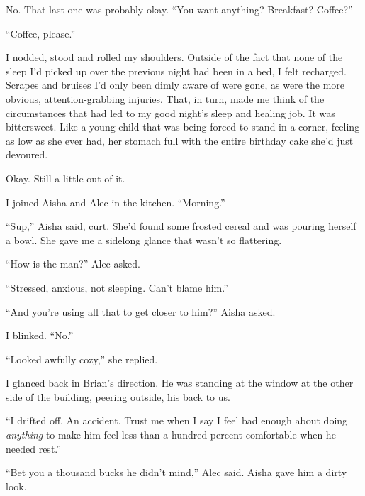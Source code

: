 No.  That last one was probably okay.  ``You want anything?  Breakfast?  Coffee?''



``Coffee, please.''



I nodded, stood and rolled my shoulders.  Outside of the fact that none of the sleep I'd picked up over the previous night had been in a bed, I felt recharged.  Scrapes and bruises I'd only been dimly aware of were gone, as were the more obvious, attention-grabbing injuries.  That, in turn, made me think of the circumstances that had led to my good night's sleep and healing job.  It was bittersweet.  Like a young child that was being forced to stand in a corner, feeling as low as she ever had, her stomach full with the entire birthday cake she'd just devoured.



Okay.  Still a little out of it.



I joined Aisha and Alec in the kitchen.  ``Morning.''



``Sup,'' Aisha said, curt.  She'd found some frosted cereal and was pouring herself a bowl.  She gave me a sidelong glance that wasn't so flattering.



``How is the man?''  Alec asked.



``Stressed, anxious, not sleeping.  Can't blame him.''



``And you're using all that to get closer to him?''  Aisha asked.



I blinked.  ``No.''



``Looked awfully cozy,'' she replied.



I glanced back in Brian's direction.  He was standing at the window at the other side of the building, peering outside, his back to us.



``I drifted off.  An accident.  Trust me when I say I feel bad enough about doing \emph{anything} to make him feel less than a hundred percent comfortable when he needed rest.''



``Bet you a thousand bucks he didn't mind,'' Alec said.  Aisha gave him a dirty look.



